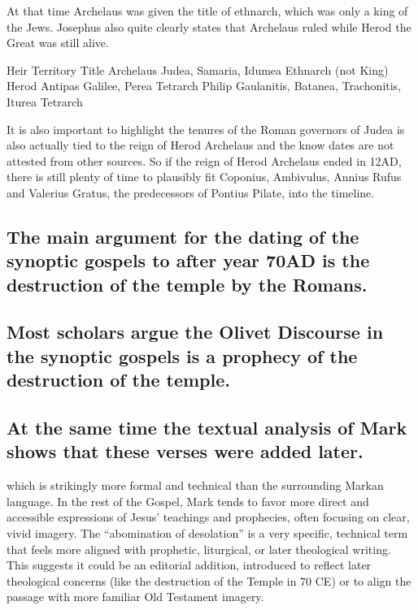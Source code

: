 At that time Archelaus was given the title of ethnarch, which was only a king of the Jews.
Josephus also quite clearly states that Archelaus ruled while Herod the Great was still alive.

Heir Territory Title Archelaus Judea, Samaria, Idumea Ethnarch (not King) Herod Antipas Galilee, Perea Tetrarch Philip Gaulanitis, Batanea, Trachonitis, Iturea Tetrarch

It is also important to highlight the tenures of the Roman governors of Judea is also actually tied to the reign of Herod Archelaus and the know dates are not attested from other sources.
So if the reign of Herod Archelaus ended in 12AD, there is still plenty of time to plausibly fit Coponius, Ambivulus, Annius Rufus and Valerius Gratus, the predecessors of Pontius Pilate, into the timeline.

\subsection{The main argument for the dating of the synoptic gospels to after year 70AD is the destruction of the temple by the Romans.}\label{subsec:the-main-argument-for-the-dating-of-the-synoptic-gospels-to-after-year-70ad-is-the-destruction-of-the-temple-by-the-romans.}

\subsection{Most scholars argue the Olivet Discourse in the synoptic gospels is a prophecy of the destruction of the temple.}\label{subsec:most-scholars-argue-the-olivet-discourse-in-the-synoptic-gospels-is-a-prophecy-of-the-destruction-of-the-temple.}

\subsection{At the same time the textual analysis of Mark shows that these verses were added later.}\label{subsec:at-the-same-time-the-textual-analysis-of-mark-shows-that-these-verses-were-added-later.}

which is strikingly more formal and technical than the surrounding Markan language.
In the rest of the Gospel, Mark tends to favor more direct and accessible expressions of Jesus' teachings and prophecies, often focusing on clear, vivid imagery.
The ``abomination of desolation'' is a very specific, technical term that feels more aligned with prophetic, liturgical, or later theological writing.
This suggests it could be an editorial addition, introduced to reflect later theological concerns (like the destruction of the Temple in 70 CE) or to align the passage with more familiar Old Testament imagery.

